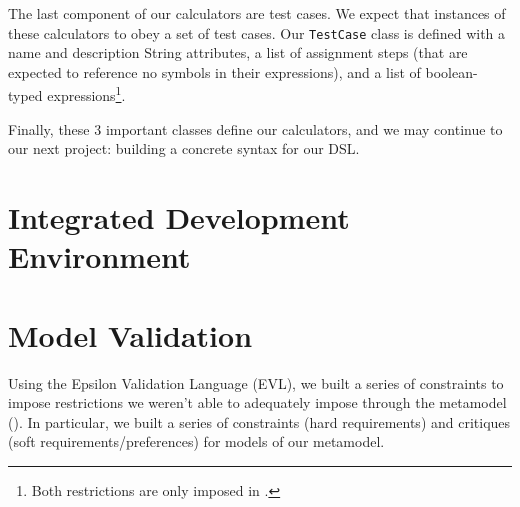 \documentclass[11pt,fleqn]{article}
\begin{document}
The last component of our calculators are test cases. We expect that instances
of these calculators to obey a set of test cases. Our \lstinline{TestCase} class
is defined with a name and description String attributes, a list of assignment
steps (that are expected to reference no symbols in their expressions), and a
list of boolean-typed expressions\footnote{Both restrictions are only imposed in
.}.

Finally, these 3 important classes define our calculators, and we may continue
to our next project: building a concrete syntax for our DSL.

\newpage{}

\section{Integrated Development Environment}
\label{sec:integrated-development-environment}

\newpage{}

\section{Model Validation}
\label{sec:model-validation}

Using the Epsilon Validation Language (EVL), we built a series of constraints to
impose restrictions we weren't able to adequately impose through the metamodel
(). In particular, we built a series of
constraints (hard requirements) and critiques (soft requirements/preferences)
for models of our metamodel.
\end{document}
